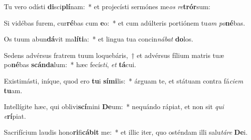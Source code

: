 \item Tu vero odísti \textbf{di}sci\textbf{plí}nam:~* et projecísti sermónes me\textit{os} \textit{re}\textbf{trór}sum:
\item Si vidébas furem, cur\textbf{ré}bas cum \textbf{e}o:~* et cum adúlteris portiónem tu\textit{am} \textit{po}\textbf{né}bas.
\item Os tuum abun\textbf{dá}vit ma\textbf{lí}\textbf{ti}a:~* et lingua tua concin\textit{ná}\textit{bat} \textbf{do}los.
\item Sedens advérsus fratrem tuum loquebáris,~† et advérsus fílium matris tuæ po\textbf{né}bas \textbf{scán}\textbf{da}lum:~* hæc fecís\textit{ti}, \textit{et} \textbf{tá}cui.
\item Existimásti, iníque, quod ero \textbf{tu}i \textbf{sí}\textbf{mi}lis:~* árguam te, et státuam contra fá\textit{ci}\textit{em} \textbf{tu}am.
\item Intellígite hæc, qui oblivi\textbf{scí}mini \textbf{De}um:~* nequándo rápiat, et non sit \textit{qui} \textit{e}\textbf{rí}piat.
\item Sacrifícium laudis hono\textbf{ri}fi\textbf{cá}\textbf{bit} me:~* et illic iter, quo osténdam illi salu\textit{tá}\textit{re} \textbf{De}i.
